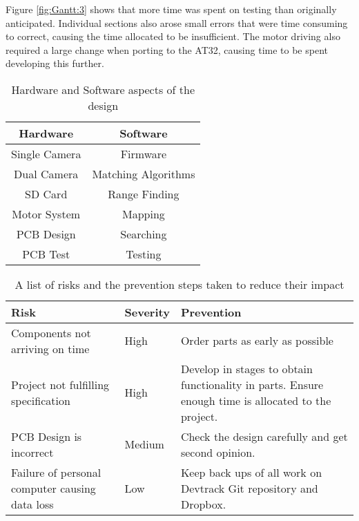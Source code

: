 Figure \ref{fig:Gantt:3} shows that more time was spent on testing than originally anticipated. Individual sections also arose small errors that were time consuming to correct, causing the time allocated to be insufficient. The motor driving also required a large change when porting to the AT32, causing time to be spent developing this further. 

\begin{table}
\centering
\caption{Hardware and Software aspects of the design}
\label{table:sections}
\begin{tabular}{cc}\toprule
\textbf{Hardware} & \textbf{Software} \\ \toprule
Single Camera	&	Firmware \\ \midrule
Dual Camera		&	Matching Algorithms \\ \midrule
SD Card			&	Range Finding \\ \midrule
Motor System	&	Mapping  \\ \midrule
PCB Design		&	Searching \\ \midrule
PCB Test		&	Testing \\ \bottomrule
\end{tabular}
\end{table}

\begin{table}
\centering
\caption{A list of risks and the prevention steps taken to reduce their impact}
\label{tab:risk}
\begin{tabular}{p{6cm}p{2cm}p{6cm}}\toprule
\textbf{Risk}						&	\textbf{Severity}	&	\textbf{Prevention} \\ \toprule
Components not arriving on time	&	High		&	Order parts as early as possible \\ \midrule
Project not fulfilling specification				&	High		&	Develop in stages to obtain functionality in parts. Ensure enough time is allocated to the project.	\\\midrule
PCB Design is incorrect		&	Medium		&	Check the design carefully and get second opinion. \\\midrule
Failure of personal computer causing data loss & Low	& 	Keep back ups of all work on Devtrack Git repository and Dropbox.\\
\bottomrule
\end{tabular}
\end{table}

